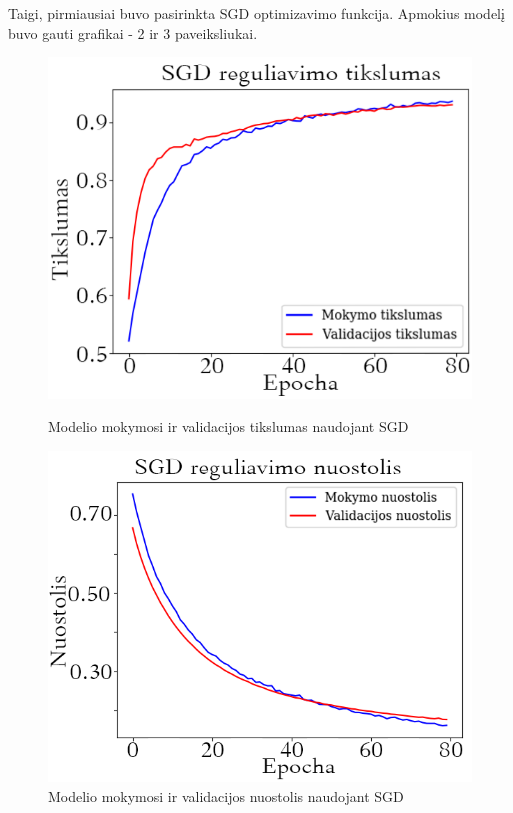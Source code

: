 \documentclass{VUMIFPSkursinis}
\begin{document}
Taigi, pirmiausiai buvo pasirinkta SGD optimizavimo funkcija. Apmokius modelį buvo gauti grafikai - 2 ir 3 paveiksliukai.

\begin{figure}[!htbp]
  \centering
  \begin{minipage}[b]{0.49\textwidth}
    \includegraphics[width=\textwidth]{img/FT/SGD_acc1.png}
    \caption{Modelio mokymosi ir validacijos tikslumas naudojant SGD}
  \end{minipage}
  \begin{minipage}[b]{0.49\textwidth}
    \includegraphics[width=\textwidth]{img/FT/SGD_loss1.png}
    \caption{Modelio mokymosi ir validacijos nuostolis naudojant SGD}
  \end{minipage}
\end{figure}
\end{document}
